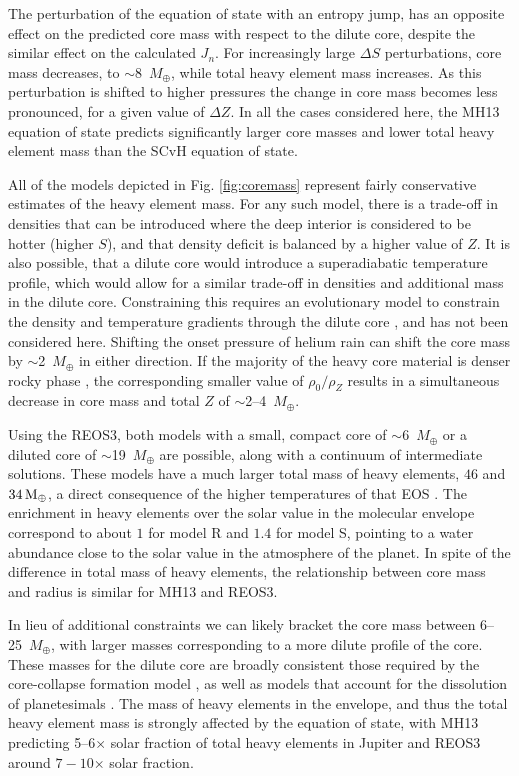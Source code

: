 The perturbation of the equation of state with an entropy jump, has an opposite
effect on the predicted core mass with respect to the dilute core, despite the similar
effect on the calculated $J_n$. For increasingly large $\Delta S$ perturbations, core
mass decreases, to $\sim$8~$M_\oplus$, while total heavy element mass increases.  As
this perturbation is shifted to higher pressures the change in core mass becomes less
pronounced, for a given value of $\Delta Z$. In all the cases considered here, the
MH13 equation of state predicts significantly larger core masses and lower
total heavy element mass than the SCvH equation of state.

All of the models depicted in Fig. \ref{fig:coremass} represent fairly conservative
estimates of the heavy element mass. For any such model, there is a trade-off in
densities that can be introduced where the deep interior is considered to be hotter
(higher $S$), and that density deficit is balanced by a higher value of $Z$. 
It is also possible, that a dilute core would
introduce a superadiabatic temperature  profile, which would allow for a similar
trade-off in densities and additional mass in the dilute core.  Constraining this
requires an evolutionary model to constrain the density and temperature gradients
through the dilute core \citep{Leconte2012,Leconte2013}, and has not been
considered here.  Shifting the onset pressure of helium rain can shift the core mass
by $\sim$2~$M_\oplus$ in either direction. If the majority
of the heavy core material is denser rocky phase \citep{Soubiran2016}, the
corresponding smaller value of $\rho_0/\rho_Z$  results in a simultaneous decrease in
core mass and total $Z$ of $\sim$2--4~$M_\oplus$.

Using the REOS3, both models with a small, compact core of $\sim$6~$M_\oplus$ or a
diluted core of $\sim$19~$M_\oplus$ are possible, along with a continuum of
intermediate solutions.  These models have a much larger total mass of heavy
elements, $46$ and $34\,\rm M_\oplus$, a direct consequence of the higher
temperatures of that EOS \citep[see][]{miguel2016}.  The enrichment in heavy elements
over the solar value in the molecular envelope correspond to about $1$ for model R
and $1.4$ for model S, pointing to a water abundance close to the solar value in the
atmosphere of the planet.  In spite of the difference in total mass of heavy
elements, the relationship between core mass and radius is similar for MH13 and
REOS3.

In lieu of additional constraints we can likely bracket the core mass between
6--25~$M_\oplus$, with larger masses corresponding to a more dilute profile of
the core. These  masses for the dilute core are broadly consistent those
required by the core-collapse formation model \cite{Pollack1996}, as well as
models  that account for the dissolution of planetesimals \citep{lozovsky2017}.
The mass of heavy elements in the envelope, and thus the total heavy element
mass is strongly affected by the equation of state, with MH13 predicting
5--6$\times$ solar fraction of total heavy elements in Jupiter and REOS3 around 
$7-10$$\times$ solar fraction.


